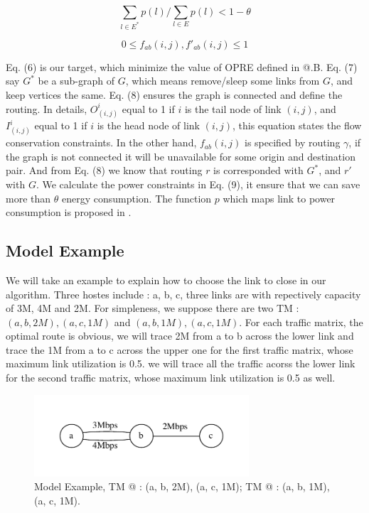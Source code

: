 \documentclass[conference]{IEEEtran}
\makeatletter
\newcommand{\Rmnum}[1]{\expandafter\@slowromancap\romannumeral #1@}
\makeatother
\begin{document}
\begin{equation}
    \sum_{l \in E^*} p(l) / \sum_{l \in E} p(l) < 1 - \theta
\end{equation}

\begin{equation}
    0 \leq f_{ab}(i,j),f'_{ab}(i,j) \leq 1
\end{equation}




Eq. (6) is our target, which minimize the value of OPRE defined in \Rmnum{3}.B. Eq. (7) say $G^*$ be a sub-graph of $G$, which means remove/sleep
some links from $G$, and keep vertices the same. Eq. (8) ensures the graph is connected and define the routing. In details, $O_{(i,j)}^i$ equal to
1 if $i$ is the tail node of link $(i,j)$, and $I_(i,j)^i$ equal to 1 if $i$ is the head node of link $(i,j)$, this equation states the flow 
conservation constraints. In the other hand, $f_{ab}(i,j)$ is specified by routing $\gamma$, if the graph is not connected it will be unavailable
for some origin and destination pair. And from Eq. (8) we know that routing $r$ is corresponded with $G^*$, and $r'$ with $G$. We calculate the 
power constraints in Eq. (9), it ensure that we can save more than $\theta$ energy consumption. The function $p$ which maps link to power consumption
is proposed in \cite{networking:greente}.

\subsection{Model Example}
We will take an example to explain how to choose the link to close in our algorithm.
Three hostes include : a, b, c, three links are with repectively capacity of 3M, 4M and 2M. For simpleness, we suppose
there are two TM : ${(a,b,2M), (a,c,1M)}$ and ${(a,b,1M), (a,c,1M)}$. For each traffic matrix, the optimal route is
obvious, we will trace 2M from a to b across the lower link and trace the 1M from a to c across the upper one
for the first traffic matrix, whose maximum link utilization is 0.5. we will trace all the traffic acorss the
lower link for the second traffic matrix, whose maximum link utilization is 0.5 as well.


\begin{figure}[!t]
\centering
\vspace*{0.1in}
\includegraphics[width=8cm]{3-nodes-example}
\caption{Model Example, TM \Rmnum{1} : (a, b, 2M), (a, c, 1M); TM \Rmnum{2} : (a, b, 1M), (a, c, 1M).}
\label{label}
\vspace*{0.1in}
\end{figure}
\end{document}
